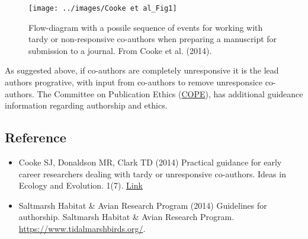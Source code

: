 \documentclass[]{article}
\begin{document}
\begin{figure}

{\centering \texttt{[image: ../images/Cooke et al\_Fig1]} 

}

\caption{Flow-diagram with a possile sequence of events for working with tardy or non-responsive co-authors when preparing a manuscript for submission to a journal. From Cooke et al. (2014).}\label{fig:unnamed-chunk-2}
\end{figure}

As suggested above, if co-authors are completely unresponsive it is the
lead authors progrative, with input from co-authors to remove
unresponsice co-authors. The Committee on Publication Ethics
(\href{https://publicationethics.org/authorship}{COPE}), has additional
guideance information regarding authorship and ethics.

\hypertarget{reference}{%
\subsection{Reference}\label{reference}}

\begin{itemize}
\item
  Cooke SJ, Donaldson MR, Clark TD (2014) Practical guidance for early
  career researchers dealing with tardy or unresponsive co-authors.
  Ideas in Ecology and Evolution. 1(7).
  \href{https://ojs.library.queensu.ca/index.php/IEE/article/view/5484}{Link}
\item
  Saltmarsh Habitat \& Avian Research Program (2014) Guidelines for
  authorship. Saltmarsh Habitat \& Avian Research Program.
  \url{https://www.tidalmarshbirds.org/}.
\end{itemize}
\end{document}
